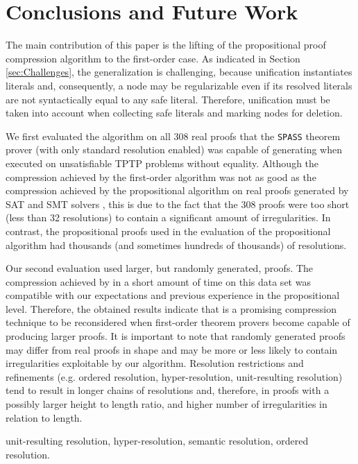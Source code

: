 \section{Conclusions and Future Work}\label{sec:conclusion}

The main contribution of this paper is the lifting of the propositional proof compression algorithm {\RPI} to the first-order case. As indicated in Section \ref{sec:Challenges}, the generalization is challenging, because unification instantiates literals and, consequently, a node may be regularizable even if its resolved literals are not syntactically equal to any safe literal. Therefore, unification must be taken into account when collecting safe literals and marking nodes for deletion.

We first evaluated the algorithm on all 308 real proofs that the \texttt{SPASS} theorem prover (with only standard resolution enabled) was capable of generating when executed on unsatisfiable TPTP problems without equality. Although the compression achieved by the first-order {\FORPI} algorithm was not as good as the compression achieved by the propositional {\RPI} algorithm on real proofs generated by SAT and SMT solvers \cite{LURPI}, this is due to the fact that the 308 proofs were too short (less than 32 resolutions) to contain a significant amount of irregularities. In contrast, the propositional proofs used in the evaluation of the propositional {\RPI} algorithm had thousands (and sometimes hundreds of thousands) of resolutions. 

Our second evaluation used larger, but randomly generated, proofs. The compression achieved by {\FORPI} in a short amount of time on this data set was compatible with our expectations and previous experience in the propositional level. Therefore, the obtained results indicate that {\FORPI} is a promising compression technique to be reconsidered when first-order theorem provers become capable of producing larger proofs. It is important to note that randomly generated proofs may differ from real proofs in shape and may be more or less likely to contain irregularities exploitable by our algorithm. Resolution restrictions and refinements (e.g. ordered resolution, hyper-resolution, unit-resulting resolution) tend to result in longer chains of resolutions and, therefore, in proofs with a possibly larger height to length ratio, and higher number of irregularities in relation to length.



unit-resulting resolution, hyper-resolution, semantic resolution, ordered resolution. 

